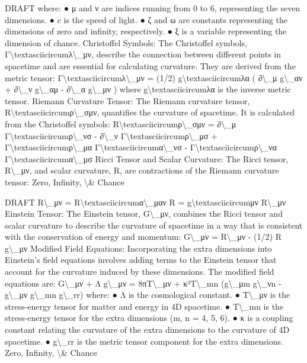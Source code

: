 \documentclass[12pt]{article}
\begin{document}
DRAFT
where:
●
μ and ν are indices running from 0 to 6, representing the seven dimensions.
●
c is the speed of light.
●
ζ and ω are constants representing the dimensions of zero and inﬁnity,
respectively.
●
ξ is a variable representing the dimension of chance.
Christoﬀel Symbols:
The Christoﬀel symbols, Γ\textbackslash{}textasciicircum{}λ\textbackslash{}_μν, describe the connection between diﬀerent points in
spacetime and are essential for calculating curvature. They are derived from the metric
tensor:
Γ\textbackslash{}textasciicircum{}λ\textbackslash{}_μν = (1/2) g\textbackslash{}textasciicircum{}λα ( ∂\textbackslash{}_μ g\textbackslash{}_αν + ∂\textbackslash{}_ν g\textbackslash{}_αμ - ∂\textbackslash{}_α g\textbackslash{}_μν )
where g\textbackslash{}textasciicircum{}λα is the inverse metric tensor.
Riemann Curvature Tensor:
The Riemann curvature tensor, R\textbackslash{}textasciicircum{}ρ\textbackslash{}_σμν, quantiﬁes the curvature of spacetime. It is
calculated from the Christoﬀel symbols:
R\textbackslash{}textasciicircum{}ρ\textbackslash{}_σμν = ∂\textbackslash{}_μ Γ\textbackslash{}textasciicircum{}ρ\textbackslash{}_νσ - ∂\textbackslash{}_ν Γ\textbackslash{}textasciicircum{}ρ\textbackslash{}_μσ + Γ\textbackslash{}textasciicircum{}ρ\textbackslash{}_μα Γ\textbackslash{}textasciicircum{}α\textbackslash{}_νσ - Γ\textbackslash{}textasciicircum{}ρ\textbackslash{}_να Γ\textbackslash{}textasciicircum{}α\textbackslash{}_μσ
Ricci Tensor and Scalar Curvature:
The Ricci tensor, R\textbackslash{}_μν, and scalar curvature, R, are contractions of the Riemann
curvature tensor:
Zero, Infinity, \textbackslash{}& Chance

DRAFT
R\textbackslash{}_μν = R\textbackslash{}textasciicircum{}α\textbackslash{}_μαν
R = g\textbackslash{}textasciicircum{}μν R\textbackslash{}_μν
Einstein Tensor:
The Einstein tensor, G\textbackslash{}_μν, combines the Ricci tensor and scalar curvature to describe
the curvature of spacetime in a way that is consistent with the conservation of energy
and momentum:
G\textbackslash{}_μν = R\textbackslash{}_μν - (1/2) R g\textbackslash{}_μν
Modiﬁed Field Equations:
Incorporating the extra dimensions into Einstein's ﬁeld equations involves adding terms
to the Einstein tensor that account for the curvature induced by these dimensions. The
modiﬁed ﬁeld equations are:
G\textbackslash{}_μν + Λ g\textbackslash{}_μν = 8πT\textbackslash{}_μν + κ²T\textbackslash{}_mn (g\textbackslash{}_μm g\textbackslash{}_νn - g\textbackslash{}_μν g\textbackslash{}_mn g\textbackslash{}_rr)
where:
●
Λ is the cosmological constant.
●
T\textbackslash{}_μν is the stress-energy tensor for matter and energy in 4D spacetime.
●
T\textbackslash{}_mn is the stress-energy tensor for the extra dimensions (m, n = 4, 5, 6).
●
κ is a coupling constant relating the curvature of the extra dimensions to the
curvature of 4D spacetime.
●
g\textbackslash{}_rr is the metric tensor component for the extra dimensions.
Zero, Infinity, \textbackslash{}& Chance
\end{document}
